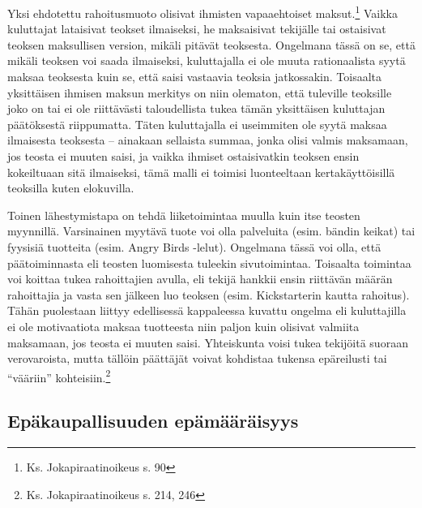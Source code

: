 \documentclass[titlepage,12pt]{article}
\begin{document}

Yksi ehdotettu rahoitusmuoto olisivat ihmisten vapaaehtoiset
maksut.\footnote{Ks. Jokapiraatinoikeus s. 90} Vaikka kuluttajat
lataisivat teokset ilmaiseksi, he maksaisivat tekijälle tai ostaisivat
teoksen maksullisen version, mikäli pitävät teoksesta.  Ongelmana
tässä on se, että mikäli teoksen voi saada ilmaiseksi, kuluttajalla ei
ole muuta rationaalista syytä maksaa teoksesta kuin se, että saisi
vastaavia teoksia jatkossakin.  Toisaalta yksittäisen ihmisen maksun
merkitys on niin olematon, että tuleville teoksille joko on tai ei ole
riittävästi taloudellista tukea tämän yksittäisen kuluttajan
päätöksestä riippumatta.  Täten kuluttajalla ei useimmiten ole syytä
maksaa ilmaisesta teoksesta -- ainakaan sellaista summaa, jonka olisi
valmis maksamaan, jos teosta ei muuten saisi, ja vaikka ihmiset
ostaisivatkin teoksen ensin kokeiltuaan sitä ilmaiseksi, tämä malli ei
toimisi luonteeltaan kertakäyttöisillä teoksilla kuten elokuvilla.



Toinen lähestymistapa on tehdä liiketoimintaa muulla kuin itse teosten
myynnillä.  Varsinainen myytävä tuote voi olla palveluita
(esim. bändin keikat) tai fyysisiä tuotteita (esim. Angry Birds
-lelut).  Ongelmana tässä voi olla, että päätoiminnasta eli teosten
luomisesta tuleekin sivutoimintaa.  Toisaalta toimintaa voi koittaa
tukea rahoittajien avulla, eli tekijä hankkii ensin riittävän määrän
rahoittajia ja vasta sen jälkeen luo teoksen (esim. Kickstarterin
kautta rahoitus).  Tähän puolestaan liittyy edellisessä kappaleessa
kuvattu ongelma eli kuluttajilla ei ole motivaatiota maksaa tuotteesta
niin paljon kuin olisivat valmiita maksamaan, jos teosta ei muuten
saisi.  Yhteiskunta voisi tukea tekijöitä suoraan verovaroista, mutta
tällöin päättäjät voivat kohdistaa tukensa epäreilusti tai ``vääriin''
kohteisiin.\footnote{Ks. Jokapiraatinoikeus s. 214, 246}







\subsection{Epäkaupallisuuden epämääräisyys}
\end{document}
